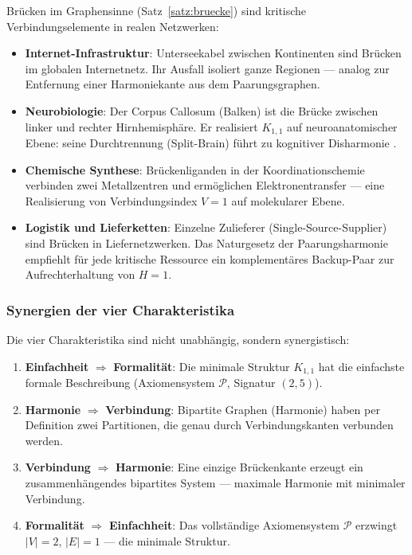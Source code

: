 ﻿\documentclass[a4paper,12pt]{article}
\theoremstyle{definition}
\begin{document}
Brücken im Graphensinne (Satz~\ref{satz:bruecke}) sind kritische Verbindungselemente
in realen Netzwerken:
\begin{itemize}
	\item \textbf{Internet-Infrastruktur}: Unterseekabel zwischen Kontinenten sind
	Brücken im globalen Internetnetz. Ihr Ausfall isoliert ganze Regionen ---
	analog zur Entfernung einer Harmoniekante aus dem Paarungsgraphen.
	\item \textbf{Neurobiologie}: Der Corpus Callosum (Balken) ist die Brücke
	zwischen linker und rechter Hirnhemisphäre. Er realisiert $K_{1,1}$ auf
	neuroanatomischer Ebene: seine Durchtrennung (Split-Brain) führt zu kognitiver
	Disharmonie \cite{weyl1952}.
	\item \textbf{Chemische Synthese}: Brückenliganden in der Koordinationschemie
	verbinden zwei Metallzentren und ermöglichen Elektronentransfer --- eine
	Realisierung von Verbindungsindex $V = 1$ auf molekularer Ebene.
	\item \textbf{Logistik und Lieferketten}: Einzelne Zulieferer (Single-Source-Supplier)
	sind Brücken in Liefernetzwerken. Das Naturgesetz der Paarungsharmonie empfiehlt
	für jede kritische Ressource ein komplementäres Backup-Paar zur Aufrechterhaltung
	von $H = 1$.
\end{itemize}

\subsubsection*{Synergien der vier Charakteristika}

Die vier Charakteristika sind nicht unabhängig, sondern synergistisch:
\begin{enumerate}
	\item \textbf{Einfachheit} $\Rightarrow$ \textbf{Formalität}: Die minimale
	Struktur $K_{1,1}$ hat die einfachste formale Beschreibung (Axiomensystem $\mathcal{P}$,
	Signatur $(2,5)$).
	\item \textbf{Harmonie} $\Rightarrow$ \textbf{Verbindung}: Bipartite Graphen
	(Harmonie) haben per Definition zwei Partitionen, die genau durch Verbindungskanten
	verbunden werden.
	\item \textbf{Verbindung} $\Rightarrow$ \textbf{Harmonie}: Eine einzige Brückenkante
	erzeugt ein zusammenhängendes bipartites System --- maximale Harmonie mit
	minimaler Verbindung.
	\item \textbf{Formalität} $\Rightarrow$ \textbf{Einfachheit}: Das vollständige
	Axiomensystem $\mathcal{P}$ erzwingt $|V| = 2$, $|E| = 1$ --- die minimale
	Struktur.
\end{enumerate}
\end{document}
